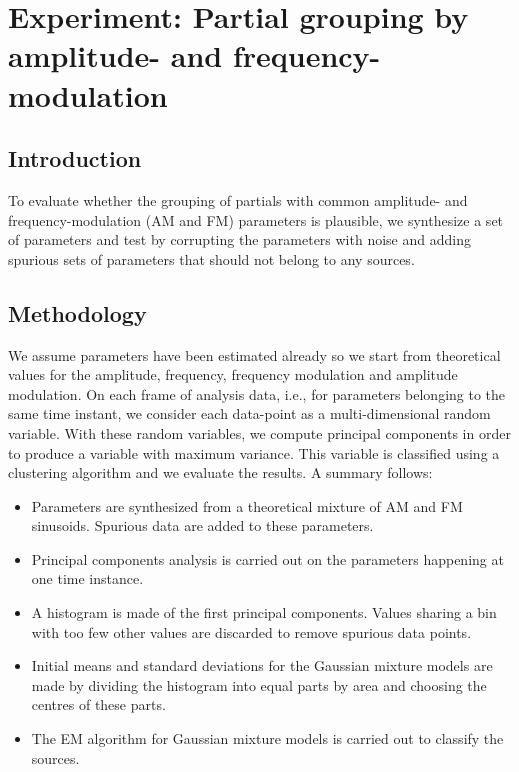 \chapter{Experiment: Partial grouping by amplitude- and
frequency-modulation\label{chap:amfmsep}}

\section{Introduction}
To evaluate whether the grouping of partials with common amplitude- and
frequency-modulation (AM and FM) parameters is
plausible, we synthesize a set of parameters and test by corrupting the
parameters with noise and adding spurious sets of parameters that should not
belong to any sources.

\section{Methodology}
We assume parameters have been estimated already so we start from theoretical
values for the amplitude, frequency, frequency modulation and amplitude
modulation.  On each frame of analysis data, i.e., for parameters belonging to
the same time instant, we consider each data-point as a multi-dimensional random
variable. With these random variables, we compute principal components in order
to produce a variable with maximum variance. This variable is classified using a
clustering algorithm and we evaluate the results. A summary follows:
\begin{itemize}
    \item 
        Parameters are synthesized from a theoretical mixture of AM and FM
        sinusoids.  Spurious data are added to these parameters.
    \item
        Principal components analysis is carried out on the parameters happening
        at one time instance.
    \item
        A histogram is made of the first principal components. Values sharing a
        bin with too few other values are discarded to remove spurious data
        points.
    \item
        Initial means and standard deviations for the Gaussian mixture models
        are made by dividing the histogram into equal parts by area and choosing
        the centres of these parts.
    \item
        The EM algorithm for Gaussian mixture models is carried out to classify
        the sources.
\end{itemize}
